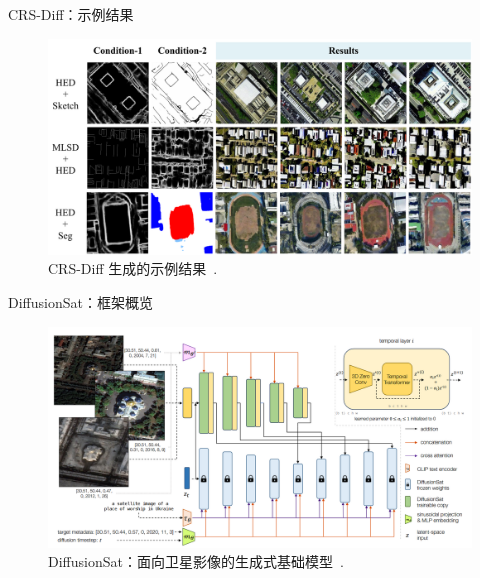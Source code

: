 \begin{refsection}
\begin{frame}{CRS-Diff：示例结果}
  \begin{figure}
    \centering
    \includegraphics[width=0.9\linewidth]{figs/crsdiff_results.png}
    \caption[]{\scriptsize CRS-Diff 生成的示例结果~\parencite{tang2024crsdiff}.}
  \end{figure}
  \bottomleftrefs
\end{frame}
\end{refsection}


\begin{refsection}
\begin{frame}{DiffusionSat：框架概览}
  \begin{figure}
    \centering
    \includegraphics[width=0.9\linewidth]{figs/diffusionsat.png}
    \caption[]{\scriptsize DiffusionSat：面向卫星影像的生成式基础模型~\parencite{diffusionset2024}.}
  \end{figure}
  \bottomleftrefs
\end{frame}
\end{refsection}


